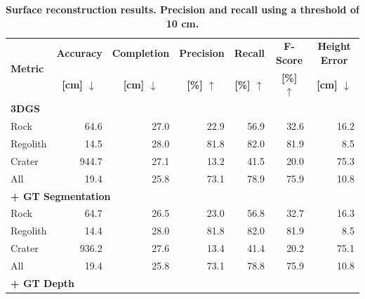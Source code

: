 \begin{table}[h]
	\centering
	\small
	\caption{\bfseries Surface reconstruction results. Precision and recall using a threshold of 10 cm.}
	\label{tab:surface_reconstruction}
	\begin{tabular}[t]{|lrrrrrr|}
		\hline
		\multirow{2}{*}{\textbf{Metric}}               &
		\multicolumn{1}{c}{\textbf{Accuracy}}          &
		\multicolumn{1}{c}{\textbf{Completion}}        &
		\multicolumn{1}{c}{\textbf{Precision}}         &
		\multicolumn{1}{c}{\textbf{Recall}}            &
		\multicolumn{1}{c}{\textbf{F-Score}}           &
		\multicolumn{1}{c|}{\textbf{Height Error}}
		\\
		\multicolumn{1}{|c}{}                          &
		\multicolumn{1}{c}{\textbf{[cm] $\downarrow$}} &
		\multicolumn{1}{c}{\textbf{[cm] $\downarrow$}} &
		\multicolumn{1}{c}{\textbf{[\%] $\uparrow$}}   &
		\multicolumn{1}{c}{\textbf{[\%] $\uparrow$}}   &
		\multicolumn{1}{c}{\textbf{[\%] $\uparrow$}}   &
		\multicolumn{1}{c|}{\textbf{[cm] $\downarrow$}}                                           \\ \hline\hline
		\multicolumn{7}{|l|}{\textbf{3DGS}}                                                       \\ \hline
		Rock                                           & 64.6  & 27.0 & 22.9 & 56.9 & 32.6 & 16.2 \\
		Regolith                                       & 14.5  & 28.0 & 81.8 & 82.0 & 81.9 & 8.5  \\
		Crater                                         & 944.7 & 27.1 & 13.2 & 41.5 & 20.0 & 75.3 \\
		All                                            & 19.4  & 25.8 & 73.1 & 78.9 & 75.9 & 10.8 \\
		\hline
		\multicolumn{7}{|l|}{\textbf{+ GT Segmentation}}                                          \\ \hline
		Rock                                           & 64.7  & 26.5 & 23.0 & 56.8 & 32.7 & 16.3 \\
		Regolith                                       & 14.4  & 28.0 & 81.8 & 82.0 & 81.9 & 8.5  \\
		Crater                                         & 936.2 & 27.6 & 13.4 & 41.4 & 20.2 & 75.1 \\
		All                                            & 19.4  & 25.8 & 73.1 & 78.8 & 75.9 & 10.8 \\
		\hline
		\multicolumn{7}{|l|}{\textbf{+ GT Depth}}                                                 \\ \hline

\end{tabular}
\end{table}
